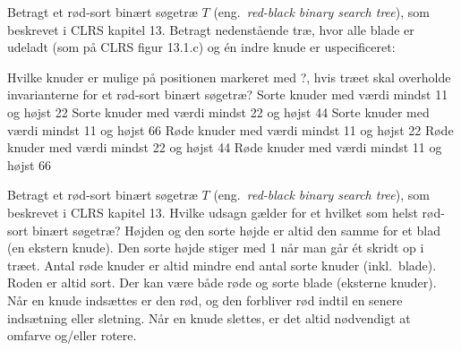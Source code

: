 Betragt et rød-sort binært søgetræ $T$ (eng.~\emph{red-black binary search tree}), som beskrevet i CLRS kapitel 13.
Betragt nedenstående træ, hvor alle blade er udeladt (som på CLRS figur 13.1.c) og én indre knude er uspecificeret:

\begin{center}
\end{center}

\medskip

Hvilke knuder er mulige på positionen markeret med ?, hvis træet skal overholde invarianterne for et rød-sort binært søgetræ?
\etsvar
\mulighederstart
\svar Sorte knuder med værdi mindst 11 og højst 22
\svar Sorte knuder med værdi mindst 22 og højst 44 \korrekt
\svar Sorte knuder med værdi mindst 11 og højst 66
\svar Røde knuder med værdi mindst 11 og højst 22
\svar Røde knuder med værdi mindst 22 og højst 44
\svar Røde knuder med værdi mindst 11 og højst 66
\mulighederslut
{}




Betragt et rød-sort binært søgetræ $T$ (eng.~\emph{red-black binary search tree}), som beskrevet i CLRS kapitel 13.
Hvilke udsagn gælder for et hvilket som helst rød-sort binært søgetræ?
\fleresvar
\mulighederstart
\svar Højden og den sorte højde er altid den samme for et blad (en ekstern knude). \korrekt
\svar Den sorte højde stiger med 1 når man går ét skridt op i træet.
\svar Antal røde knuder er altid mindre end antal sorte knuder (inkl.~blade).  \korrekt
\svar Roden er altid sort. \korrekt
\svar Der kan være både røde og sorte blade (eksterne knuder).
\svar Når en knude indsættes er den rød, og den forbliver rød indtil en senere indsætning eller sletning.
\svar Når en knude slettes, er det altid nødvendigt at omfarve og/eller rotere.
\mulighederslut

